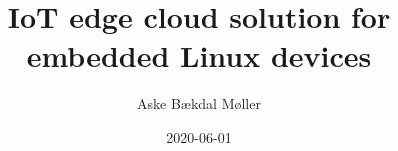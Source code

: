 \author{Aske Bækdal Møller}
\title{IoT edge cloud solution for embedded Linux devices}
\date{2020-06-01}
\newcommand{\supervisor}{Tórur Andreassen}
